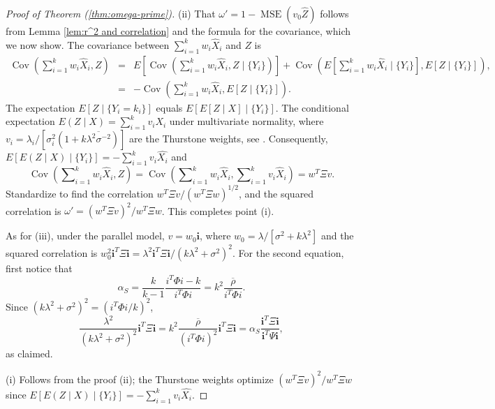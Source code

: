 \documentclass[twoside]{article}
\DeclareMathOperator{\Cov}{Cov}
\DeclareMathOperator{\MSE}{MSE}
\DeclareMathOperator{\tsum}{\textstyle \sum}
\renewcommand{\sqrt}[1]{{(#1)^{1/2}}}
\begin{document}
\begin{proof}[Proof of Theorem (\ref{thm:omega-prime})]
\label{proof:omega-prime}(ii) That $\omega'=1-\MSE(v_{0}\hat{Z})$
follows from Lemma \ref{lem:r^2 and correlation} and the formula
for the covariance, which we now show. The covariance between $\tsum_{i=1}^{k}w_{i}\hat{X}_{i}$
and $Z$ is
\begin{eqnarray*}
\Cov(\tsum_{i=1}^{k}w_{i}\hat{X}_{i},Z) & = & E[\Cov(\tsum_{i=1}^{k}w_{i}\hat{X}_{i},Z\mid\{Y_{i}\})]+\Cov(E[\tsum_{i=1}^{k}w_{i}\hat{X}_{i}\mid\{Y_{i}\}],E[Z\mid\{Y_{i}\}]),\\
 & = & -\Cov(\tsum_{i=1}^{k}w_{i}\hat{X}_{i},E[Z\mid\{Y_{i}\}]).
\end{eqnarray*}
The expectation $E[Z\mid\{Y_{i}=k_{i}\}]$ equals $E[E[Z\mid X]\mid\{Y_{i}\}]$.
The conditional expectation $E(Z\mid X)=\tsum_{i=1}^{k}v_{i}X_{i}$
under multivariate normality, where $v_{i}=\lambda_{i}/[\sigma_{i}^{2}(1+k\overline{\lambda^{2}\sigma^{-2}})]$
are the Thurstone weights, see \citet[Theorem 3.3.4]{Tong1990-lm}.
Consequently, $E[E(Z\mid X)\mid\{Y_{i}\}]=-\tsum_{i=1}^{k}v_{i}\hat{X_{i}}$
and 
\begin{equation*}
\Cov(\tsum_{i=1}^{k}w_{i}\hat{X}_{i},Z) =  \Cov(\tsum_{i=1}^{k}w_{i}\hat{X}_{i},\tsum_{i=1}^{k}v_{i}\hat{X}_{i})=w^{T}\Xi v.
\end{equation*}
Standardize to find the correlation $w^{T}\Xi v/\sqrt{w^{T}\Xi w}$,
and the squared correlation is $\omega'=(w^{T}\Xi v)^{2}/w^{T}\Xi w$.
This completes point (i). 

As for (iii), under the parallel model, $v=w_{0}\mathbf{i}$, where
$w_{0}=\lambda/[\sigma^{2}+k\lambda^{2}]$ and the squared correlation
is $w_{0}^{2}\mathbf{i}^{T}\Xi\mathbf{i}=\lambda^{2}\mathbf{i}^{T}\Xi\mathbf{i}/(k\lambda^{2}+\sigma^{2})^{2}$.
For the second equation, first notice that
\[
\alpha_S=\frac{k}{k-1}\frac{i^{T}\Phi i-k}{i^{T}\Phi i}=k^{2}\frac{\overline{\rho}}{i^{T}\Phi i}.
\]
Since $(k\lambda^{2}+\sigma^{2})^{2}=(i^{T}\Phi i/k)^{2}$, 
\begin{equation}
\frac{\lambda^{2}}{(k\lambda^{2}+\sigma^{2})^{2}}\mathbf{i}^{T}\Xi\mathbf{i} =  k^{2}\frac{\overline{\rho}}{(i^{T}\Phi i)^{2}}\mathbf{i}^{T}\Xi\mathbf{i} =  \alpha_S\frac{\mathbf{i}^{T}\Xi\mathbf{i}}{\mathbf{i}^{T}\Psi\mathbf{i}},\nonumber
\end{equation}
as claimed.

(i) Follows from the proof (ii); the Thurstone weights optimize $(w^{T}\Xi v)^{2}/w^{T}\Xi w$
since $E[E(Z\mid X)\mid\{Y_{i}\}]=-\tsum_{i=1}^{k}v_{i}\hat{X_{i}}$.
\end{proof}


\end{document}
